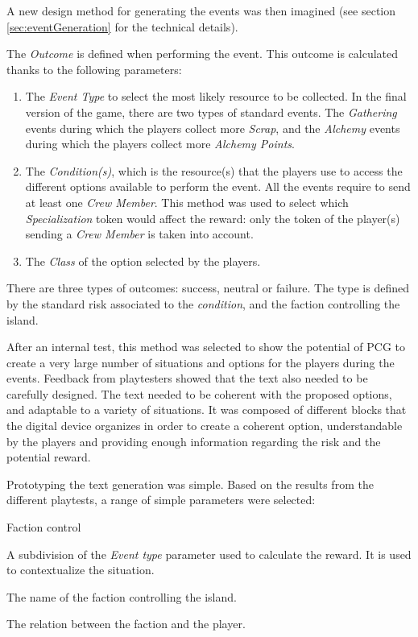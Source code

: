 A new design method for generating the events was then imagined (see section \ref{sec:eventGeneration} for the technical details).

The \textit{Outcome} is defined when performing the event. This outcome is calculated thanks to the following parameters:
\begin{enumerate}
\item The \textit{Event Type} to select the most likely resource to be collected. In the final version of the game, there are two types of standard events. The \textit{Gathering} events during which the players collect more \textit{Scrap}, and the \textit{Alchemy} events during which the players collect more \textit{Alchemy Points}.
\item The \textit{Condition(s)}, which is the resource(s) that the players use to access the different options available to perform the event. All the events require to send at least one \textit{Crew Member}. This method was used to select which \textit{Specialization} token would affect the reward: only the token of the player(s) sending a \textit{Crew Member} is taken into account.
\item The \textit{Class} of the option selected by the players. 
\end{enumerate}
There are three types of outcomes: success, neutral or failure. The type is defined by the standard risk associated to the \textit{condition}, and the faction controlling the island. 

After an internal test, this method was selected to show the potential of PCG to create a very large number of situations and options for the players during the events. Feedback from playtesters showed that the text also needed to be carefully designed. The text needed to be coherent with the proposed options, and adaptable to a variety of situations. It was composed of different blocks that the digital device organizes in order to create a coherent option, understandable by the players and providing enough information regarding the risk and the potential reward.

Prototyping the text generation was simple. Based on the results from the different playtests, a range of simple parameters were selected:
\begin{labeling}{Faction control}
\item [\textbf{Location Type}] A subdivision of the \textit{Event type} parameter used to calculate the reward. It is used to contextualize the situation.
\item [\textbf{Faction control}] The name of the faction controlling the island.
\item [\textbf{Allegiance}] The relation between the faction and the player.
\end{labeling}

